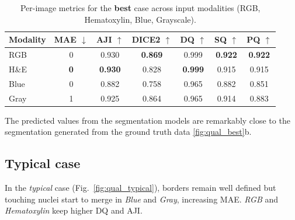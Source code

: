 \documentclass[target=bach,aauheader=,style=]{thud}
\begin{document}
\begin{table}[ht]
\centering
\caption{Per-image metrics for the \textbf{best} case across input modalities (RGB, Hematoxylin, Blue, Grayscale). }
\label{tab:best_metrics}
\begin{tabular}{lcccccc}
\toprule
Modality & MAE $\downarrow$ & AJI $\uparrow$ & DICE2 $\uparrow$ & DQ $\uparrow$ & SQ $\uparrow$ & PQ $\uparrow$ \\
\midrule
RGB  & 0 & 0.930 & \textbf{0.869} & 0.999 & \textbf{0.922} & \textbf{0.922} \\
H\&E & \textbf{0} & \textbf{0.930} & 0.828 & \textbf{0.999} & 0.915 & 0.915 \\
Blue & 0 & 0.882 & 0.758 & 0.965 & 0.882 & 0.851 \\
Gray & 1 & 0.925 & 0.864 & 0.965 & 0.914 & 0.883 \\
\bottomrule
\end{tabular}
\end{table}
The predicted values from the segmentation models are remarkably close to the segmentation generated from the ground truth data \ref{fig:qual_best}b. 
\subsection{Typical case}
In the \emph{typical} case (Fig.~\ref{fig:qual_typical}), borders remain well defined but touching nuclei start to merge in \emph{Blue} and \emph{Gray}, increasing MAE. \emph{RGB} and \emph{Hematoxylin} keep higher DQ and AJI.
\end{document}
